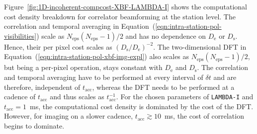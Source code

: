 \documentclass[
  journal=pasa,
  manuscript=article-type,
  year=2020,
  volume=37,
]{cup-journal}
\begin{document}
Figure~\ref{fig:1D-incoherent-compcost-XBF-LAMBDA-I} shows the computational cost density breakdown for correlator beamforming at the station level. The correlation and temporal averaging in Equation~(\ref{eqn:intra-station-pol-visibilities}) scale as $N_\textrm{eps}(N_\textrm{eps}-1)/2$ and has no dependence on $D_\textrm{e}$ or $D_\textrm{s}$. Hence, their per pixel cost scales as $(D_\textrm{s}/D_\textrm{e})^{-2}$. The two-dimensional DFT in Equation~(\ref{eqn:intra-station-pol-xbf-img-expl}) also scales as $N_\textrm{eps}(N_\textrm{eps}-1)/2$, but being a per-pixel operation, stays constant with $D_\textrm{e}$ and $D_\textrm{s}$. The correlation and temporal averaging have to be performed at every interval of $\delta t$ and are therefore, independent of $t_\textrm{acc}$, whereas the DFT needs to be performed at a cadence of $t_\textrm{acc}$ and thus scales as $t_\textrm{acc}^{-1}$. For the chosen parameters of \texttt{LAMBDA-I} and $t_\textrm{acc}=1$~ms, the computational cost density is dominated by the cost of the DFT. However, for imaging on a slower cadence, $t_\textrm{acc}\gtrsim 10$~ms, the cost of correlation begins to dominate. 

\end{document}
